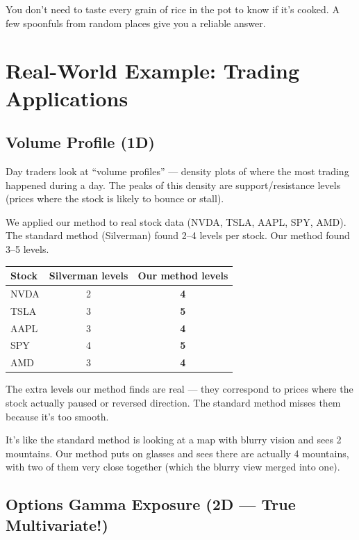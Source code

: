 \documentclass[12pt]{article}
\newcommand{\analogy}[1]{\begin{tcolorbox}[colback=green!5,colframe=green!50!black,title=Analogy]\small #1\end{tcolorbox}}
\begin{document}
\analogy{You don't need to taste every grain of rice in the pot to know if it's cooked. A few spoonfuls from random places give you a reliable answer.}

\section{Real-World Example: Trading Applications}

\subsection{Volume Profile (1D)}

Day traders look at ``volume profiles'' --- density plots of where the most trading happened during a day. The peaks of this density are support/resistance levels (prices where the stock is likely to bounce or stall).

We applied our method to real stock data (NVDA, TSLA, AAPL, SPY, AMD). The standard method (Silverman) found 2--4 levels per stock. Our method found 3--5 levels.

\begin{center}
\begin{tabular}{lcc}
\toprule
Stock & Silverman levels & Our method levels \\
\midrule
NVDA & 2 & \textbf{4} \\
TSLA & 3 & \textbf{5} \\
AAPL & 3 & \textbf{4} \\
SPY  & 4 & \textbf{5} \\
AMD  & 3 & \textbf{4} \\
\bottomrule
\end{tabular}
\end{center}

The extra levels our method finds are real --- they correspond to prices where the stock actually paused or reversed direction. The standard method misses them because it's too smooth.

\analogy{It's like the standard method is looking at a map with blurry vision and sees 2 mountains. Our method puts on glasses and sees there are actually 4 mountains, with two of them very close together (which the blurry view merged into one).}

\subsection{Options Gamma Exposure (2D --- True Multivariate!)}
\end{document}
